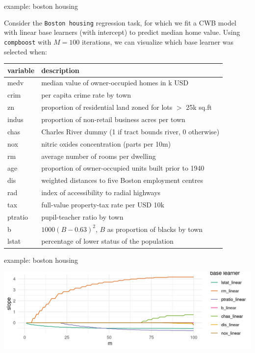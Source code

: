 \documentclass[11pt,compress,t,notes=noshow, xcolor=table]{beamer}
\begin{document}
\begin{frame2}{example: boston housing}

\begin{minipage}[c]{0.4\textwidth}
  \small
  \raggedright
  Consider the \texttt{Boston housing} regression task, for which we fit a
  CWB model with linear base learners (with intercept) to predict median home
  value.
  Using \texttt{compboost} with $M = 100$ iterations, we can
  visualize which base learner was selected when:
\end{minipage}%
\begin{minipage}[c]{0.05\textwidth}
  \phantom{foo}
\end{minipage}%
\begin{minipage}[c]{0.55\textwidth}
  \tiny
  \begin{tabular}{l|l}
    \textbf{variable} & \textbf{description} \\
    \hline
    medv &	median value of owner-occupied homes in k USD \\
    \hline
    crim & per capita crime rate by town \\
    zn &	proportion of residential land zoned for lots $>$ 25k sq.ft \\
    indus &	proportion of non-retail business acres per town \\
    chas &	Charles River dummy (1 if tract bounds river, 0 otherwise) \\
    nox &	nitric oxides concentration (parts per 10m) \\
    rm &	average number of rooms per dwelling \\
    age &	proportion of owner-occupied units built prior to 1940 \\
    dis &	weighted distances to five Boston employment centres \\
    rad &	index of accessibility to radial highways \\
    tax &	full-value property-tax rate per USD 10k \\
    ptratio &	pupil-teacher ratio by town \\
    b &	$1000(B - 0.63)^2$,  $B$ as proportion of blacks by town \\
    lstat &	percentage of lower status of the population \\
  \end{tabular}
\end{minipage}%

\end{frame2}
\begin{frame2}{example: boston housing}

\begin{center}
\includegraphics[width = \textwidth]{figure/compboost-illustration-1.png}
\end{center}

\end{frame2}
\end{document}

